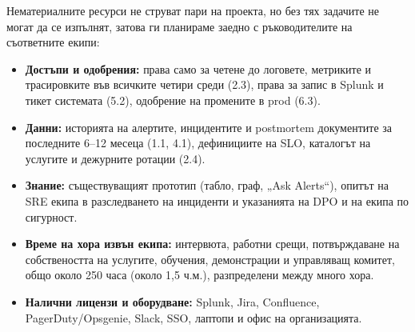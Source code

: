 \documentclass[11pt,a4paper]{article}
\begin{document}
Нематериалните ресурси не струват пари на проекта, но без тях задачите не могат да се изпълнят, затова ги планираме заедно с ръководителите на съответните екипи:
\begin{itemize}
\item \textbf{Достъпи и одобрения:} права само за четене до логовете, метриките и трасировките във всичките четири среди (2.3), права за запис в Splunk и тикет системата (5.2), одобрение на промените в prod (6.3).
\item \textbf{Данни:} историята на алертите, инцидентите и postmortem документите за последните 6--12 месеца (1.1, 4.1), дефинициите на SLO, каталогът на услугите и дежурните ротации (2.4).
\item \textbf{Знание:} съществуващият прототип (табло, граф, „Ask Alerts“), опитът на SRE екипа в разследването на инциденти и указанията на DPO и на екипа по сигурност.
\item \textbf{Време на хора извън екипа:} интервюта, работни срещи, потвърждаване на собствеността на услугите, обучения, демонстрации и управляващ комитет, общо около 250 часа (около 1,5 ч.м.), разпределени между много хора.
\item \textbf{Налични лицензи и оборудване:} Splunk, Jira, Confluence, PagerDuty/Opsgenie, Slack, SSO, лаптопи и офис на организацията.
\end{itemize}
\end{document}
